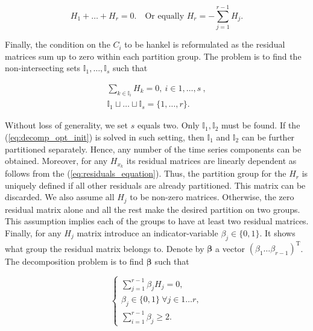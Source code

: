 \documentclass[referee, pdflatex, sn-mathphys-num]{sn-jnl}
\theoremstyle{definition}
\theoremstyle{plain}
\begin{document}
	\begin{equation}\label{eq:residuals_equation}
		H_1 + \ldots + H_r = 0. \quad \text{Or equally } H_r = - \sum\limits_{j = 1}^{r - 1} H_j.
	\end{equation}
	
	Finally, the condition on the $ C_i $ to be hankel is reformulated as the residual matrices sum up to zero within each partition group. The problem is to find the non-intersecting sets $ \mathbb{I}_1, \ldots , \mathbb{I}_s $ such that
	
	\begin{gather}\label{eq:decomp_opt_init}
		\sum_{k \in \mathbb{I}_i} H_k = 0, \ i \in 1, \ldots, s \ , \\
		\mathbb{I}_1 \sqcup \ldots \sqcup \mathbb{I}_s = \{1, \ldots, r\} . \nonumber
	\end{gather}
	
	Without loss of generality, we set $ s $ equals two. Only $ \mathbb{I}_1, \mathbb{I}_2 $ must be found. If the (\ref{eq:decomp_opt_init}) is solved in such setting, then $ \mathbb{I}_1 $ and $ \mathbb{I}_2 $ can be further partitioned separately. Hence, any number of the time series components can be obtained. Moreover, for any $ H_{x_k} $ its residual matrices are linearly dependent as follows from the (\ref{eq:residuals_equation}). Thus, the partition group for the $ H_r $ is uniquely defined if all other residuals are already partitioned. This matrix can be discarded. We also assume all $ H_j $ to be non-zero matrices. Otherwise, the zero residual matrix alone and all the rest make the desired partition on two groups. This assumption implies each of the groups to have at least two residual matrices. Finally, for any $ H_j $ matrix introduce an indicator-variable $ \beta_j \in \{0, 1\} $. It shows what group the residual matrix belongs to. Denote by $ \boldsymbol{\beta} $ a vector $ (\beta_1 \ldots \beta_{r-1})^{\text{T}} $. The decomposition problem is to find $ \boldsymbol{\beta} $ such that
	
	\begin{equation}\label{eq:first_optimal_decomp}
		\begin{cases*}
			\sum\limits_{j = 1}^{r - 1} \beta_j H_j = 0, \\
			\beta_j \in \{0, 1\} \ \forall j \in 1 \ldots r, \\
			\sum\limits_{i = 1}^{r - 1} \beta_j \ge 2.
		\end{cases*}
	\end{equation}
	
\end{document}
